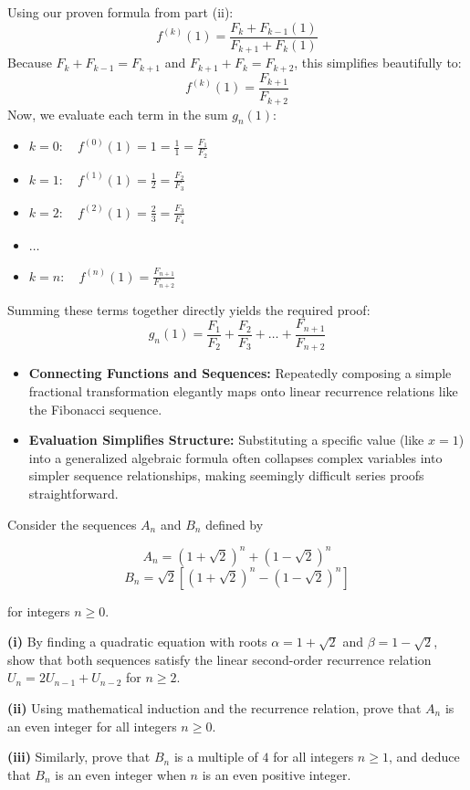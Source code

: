 \begin{solution}
Using our proven formula from part (ii):
\[
f^{(k)}(1) = \frac{F_k + F_{k-1}(1)}{F_{k+1} + F_k(1)}
\]
Because $F_k + F_{k-1} = F_{k+1}$ and $F_{k+1} + F_k = F_{k+2}$, this simplifies beautifully to:
\[
f^{(k)}(1) = \frac{F_{k+1}}{F_{k+2}}
\]
Now, we evaluate each term in the sum $g_n(1)$:
\begin{itemize}[leftmargin=*]
    \item $k=0: \quad f^{(0)}(1) = 1 = \frac{1}{1} = \frac{F_1}{F_2}$
    \item $k=1: \quad f^{(1)}(1) = \frac{1}{2} = \frac{F_2}{F_3}$
    \item $k=2: \quad f^{(2)}(1) = \frac{2}{3} = \frac{F_3}{F_4}$
    \item $\dots$
    \item $k=n: \quad f^{(n)}(1) = \frac{F_{n+1}}{F_{n+2}}$
\end{itemize}
Summing these terms together directly yields the required proof:
\[
g_n(1) = \frac{F_1}{F_2} + \frac{F_2}{F_3} + \dots + \frac{F_{n+1}}{F_{n+2}}
\]
\end{solution}

\begin{takeaways}
\begin{itemize}[leftmargin=*]
    \item \textbf{Connecting Functions and Sequences:} Repeatedly composing a simple fractional transformation elegantly maps onto linear recurrence relations like the Fibonacci sequence.
    \item \textbf{Evaluation Simplifies Structure:} Substituting a specific value (like $x=1$) into a generalized algebraic formula often collapses complex variables into simpler sequence relationships, making seemingly difficult series proofs straightforward.
\end{itemize}
\end{takeaways}

\begin{problem}
Consider the sequences $A_n$ and $B_n$ defined by 

$$A_n = (1+\sqrt{2})^n + (1-\sqrt{2})^n$$
$$B_n = \sqrt{2}\left[(1+\sqrt{2})^n - (1-\sqrt{2})^n\right]$$

for integers $n \ge 0$.

\textbf{(i)} By finding a quadratic equation with roots $\alpha = 1+\sqrt{2}$ and $\beta = 1-\sqrt{2}$, show that both sequences satisfy the linear second-order recurrence relation $U_n = 2U_{n-1} + U_{n-2}$ for $n \ge 2$.

\textbf{(ii)} Using mathematical induction and the recurrence relation, prove that $A_n$ is an even integer for all integers $n \ge 0$.

\textbf{(iii)} Similarly, prove that $B_n$ is a multiple of $4$ for all integers $n \ge 1$, and deduce that $B_n$ is an even integer when $n$ is an even positive integer.
\end{problem}

